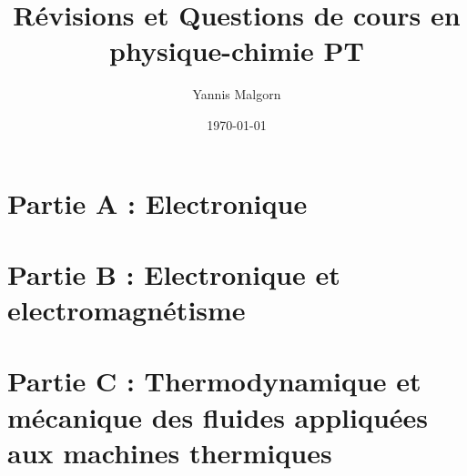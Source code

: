 \documentclass{article}
\title{Révisions et Questions de cours en physique-chimie PT}
\author{Yannis Malgorn}
\date{\today}
\begin{document}
\maketitle
\newpage

\section*{\centering\huge Partie A : Electronique}




\section*{\centering\huge Partie B : Electronique et electromagnétisme} 




\section*{\centering\huge Partie C : Thermodynamique et mécanique des fluides appliquées aux machines thermiques}

\end{document}
